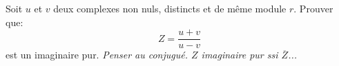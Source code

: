 \begin{exercice}

 Soit $u$ et $v$ deux complexes non nuls, distincts et de
  m\^eme module $r$. Prouver que:
\[Z=\frac{u+v}{u-v}\]
est un imaginaire pur. \emph{Penser au conjugu\'e. $Z$ imaginaire pur
  ssi $\overline{Z}$...}
\end{exercice}
